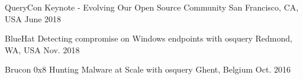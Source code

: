 \begin{cvhonors}

\cvhonor
{QueryCon} %
{Keynote - Evolving Our Open Source Community} %
{San Francisco, CA, USA} %
{June 2018} %


\cvhonor
{BlueHat} %
{Detecting compromise on Windows endpoints with osquery} %
{Redmond, WA, USA} %
{Nov. 2018} %


\cvhonor
{Brucon 0x8} %
{Hunting Malware at Scale with osquery} %
{Ghent, Belgium} %
{Oct. 2016} %



\end{cvhonors}
